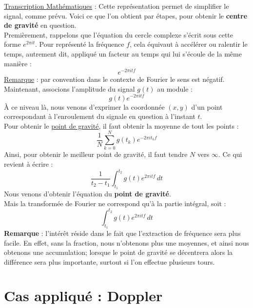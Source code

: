 \documentclass[a4paper]{book}
\begin{document}
\underline{Transcription Mathématiques} : Cette représentation permet de
simplifier le signal, comme prévu. Voici ce que l'on obtient par étapes, pour
obtenir le \textbf{centre de gravité} en question. \\
Premièrement, rappelons que l'équation du cercle complexe s'écrit sous cette
forme $e^{2 \pi i t}$. Pour représenté la fréquence $f$, cela équivaut à accélérer
ou ralentir le temps, autrement dit, appliqué un facteur au temps qui lui
s'écoule de la même manière :
\begin{equation}
	e^{- 2 \pi i t f}
\end{equation}
\underline{Remarque} : par convention dans le contexte de Fourier le sens est
négatif.\\
Maintenant, associons l'amplitude du signal $g(t)$ au module :
\begin{equation}
	g(t) e^{- 2 \pi i t f}
\end{equation}
À ce niveau là, nous venons d'exprimer la coordonnée $(x,y)$ d'un point
correspondant à l'enroulement du signale en question à l'instant $t$.\\
Pour obtenir le \underline{point de gravité}, il faut obtenir la moyenne de tout
les points :
\begin{equation}
	\frac{1}{N} \sum_{k=0}^{N} g(t_{k}) e^{- 2 \pi i t_{k} f}
\end{equation}
Ainsi, pour obtenir le meilleur point de gravité, il faut tendre $N$ vers
$\infty$. Ce qui revient à écrire :
\begin{equation}
	\frac{1}{t_{2} - t_{1}} \int_{t_{1}}^{t_{2}} g(t) e^{2 \pi i t f} \, dt
\end{equation}
Nous venons d'obtenir l'équation du \textbf{point de gravité}.\\
Mais la transformée de Fourier ne correspond qu'à la partie intégral, soit :
\begin{equation}
	\int_{t_{1}}^{t_{2}} g(t) e^{2 \pi i t f} \, dt
\end{equation}
\textbf{Remarque} : l'intérêt réside dans le fait que l'extraction de fréquence
sera plus facile. En effet, sans la fraction, nous n'obtenons plus une moyennes,
et ainsi nous obtenons une accumulation; lorsque le point de gravité se
décentrera alors la différence sera plus importante, surtout si l'on effectue
plusieurs tours.

\section{Cas appliqué : Doppler }
\end{document}
